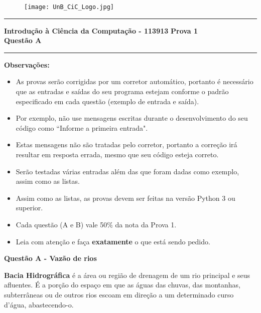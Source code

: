 \documentclass[a4paper, 12pt]{article}
\begin{document}
\begin{figure}[H]
	\texttt{[image: UnB\_CiC\_Logo.jpg]}
\end{figure}
\noindent\rule{\textwidth}{0.4pt}
\begin{center}
	\textbf{{\Large Introdução à Ciência da Computação - 113913}} \newline \newline
	\textbf{{\large Prova 1} \\
	\vspace{9pt}
	{\large Questão A}} \\
	\noindent\rule{\textwidth}{0.4pt}
	\newline
\end{center}

\textbf{{\large Observações:}}
\begin{itemize}
	\item As provas serão corrigidas por um corretor automático, portanto é necessário que as entradas e saídas do seu programa estejam conforme o padrão especificado em cada questão (exemplo de entrada e saída).
	\item Por exemplo, não use mensagens escritas durante o desenvolvimento do seu código como “Informe a primeira entrada".
	\item Estas mensagens não são tratadas pelo corretor, portanto a correção irá resultar em resposta errada, mesmo que seu código esteja correto.
	\item Serão testadas várias entradas além das que foram dadas como exemplo, assim como as listas.
	\item Assim como as listas, as provas devem ser feitas na versão Python 3 ou superior.
	\item Cada questão (A e B) vale 50\% da nota da Prova 1.
	\item Leia com atenção e faça \textbf{exatamente} o que está sendo pedido.


\end{itemize}
\newpage %
\begin{center}
\textbf{{\Large Questão A - Vazão de rios}}
\end{center}

\vspace{5pt} 

\textbf{Bacia Hidrográfica} é a área ou região de drenagem de um rio principal e seus afluentes. É a porção do espaço em que as águas das chuvas, das montanhas, subterrâneas ou de outros rios escoam em direção a um determinado curso d’água, abastecendo-o.
\end{document}
